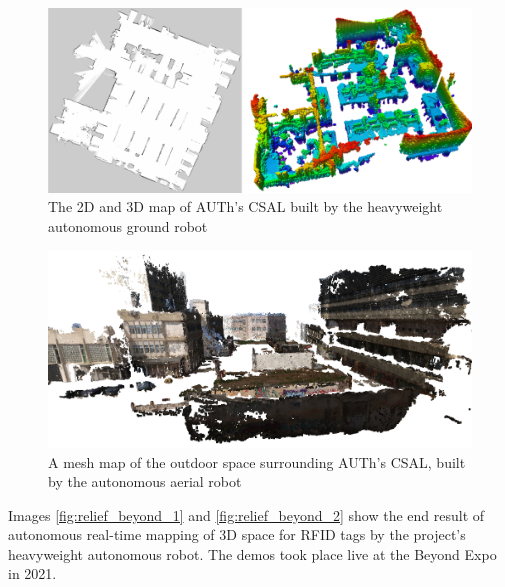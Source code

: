 \vfill

\begin{figure}[H]\centering
  \includegraphics[scale=0.4]{images/relief/csal_maps.png}
  \caption{\small The 2D and 3D map of AUTh's CSAL built by the heavyweight
           autonomous ground robot}
  \label{fig:csal_maps}
\end{figure}

\vfill

\begin{figure}[H]\centering
  \includegraphics[scale=0.3]{images/relief/e_map.png}
  \caption{\small A mesh map of the outdoor space surrounding AUTh's CSAL,
           built by the autonomous aerial robot}
  \label{fig:e_map}
\end{figure}


Images \ref{fig:relief_beyond_1} and \ref{fig:relief_beyond_2} show the end
result of autonomous real-time mapping of 3D space for RFID tags by the
project's heavyweight autonomous robot. The demos took place live at the Beyond
Expo in 2021.




